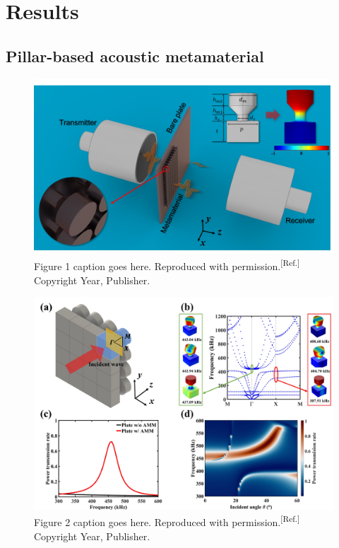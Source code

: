 \documentclass{WileyMSP-template}
\begin{document}

\section{Results}
\subsection{Pillar-based acoustic metamaterial}



\begin{figure}
  \includegraphics[width=\linewidth]{Figure1.jpg}
  \caption{Figure 1 caption goes here. Reproduced with permission.\textsuperscript{[Ref.]} Copyright Year, Publisher. }
  \label{fig:boat1}
\end{figure}

\begin{figure}
  \includegraphics[width=\linewidth]{Figure2.jpg}
  \caption{Figure 2 caption goes here. Reproduced with permission.\textsuperscript{[Ref.]} Copyright Year, Publisher.}
  \label{fig:boat1}
\end{figure}
\end{document}
